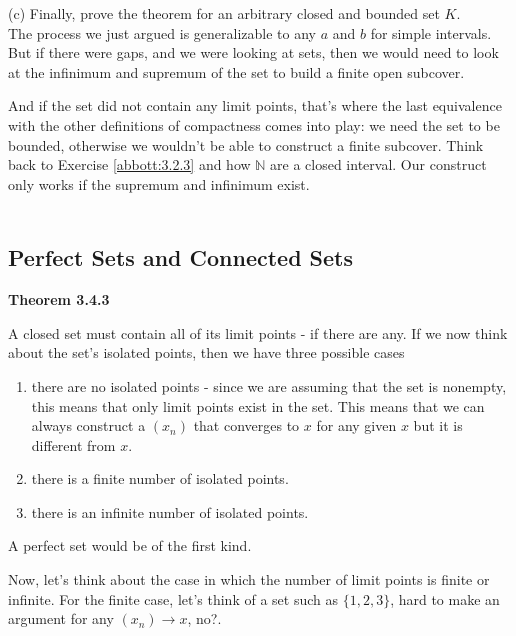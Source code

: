 (c) Finally, prove the theorem for an arbitrary closed and bounded set $K$.
\\

The process we just argued is generalizable to any $a$ and $b$ for simple intervals.
But if there were gaps, and we were looking at sets, then we would need to look at the infinimum and supremum
of the set to build a finite open subcover.

And if the set did not contain any limit points, that's where the last equivalence with the other definitions of
compactness comes into play: we need the set to be bounded, otherwise we wouldn't be able to construct a finite subcover.
Think back to Exercise \ref{abbott:3.2.3} and how $\mathbb{N}$ are a closed interval.
Our construct only works if the supremum and infinimum exist.
\\~\\








\subsection{Perfect Sets and Connected Sets}

\textbf{Theorem 3.4.3} 

A closed set must contain all of its limit points - if there are any.
If we now think about the set's isolated points, then we have three possible cases
\begin{enumerate}
\item there are no isolated points - since we are assuming that the set is nonempty, this means
    that only limit points exist in the set. This means that we can always construct a $(x_n)$
    that converges to $x$ for any given $x$ but it is different from $x$.
\item there is a finite number of isolated points.
\item there is an infinite number of isolated points.
\end{enumerate}

A perfect set would be of the first kind.

Now, let's think about the case in which the number of limit points is finite or infinite.
For the finite case, let's think of a set such as $\{1, 2, 3\}$, hard to make an argument for
any $(x_n) \rightarrow x$, no?.
\\

